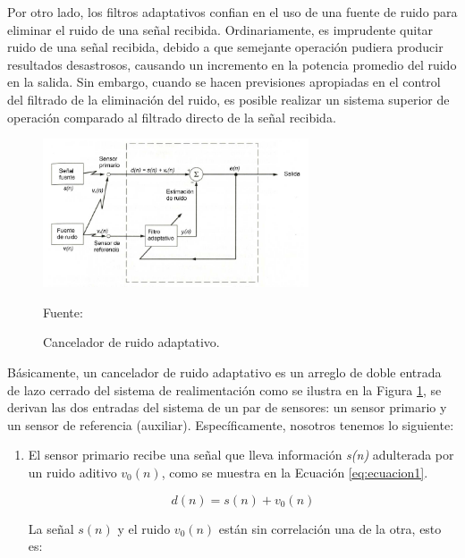 \begin{enumerate}
\begin{enumerate}
Por otro lado, los filtros adaptativos confian en el uso de una fuente de ruido para eliminar el ruido de una señal recibida. Ordinariamente, es imprudente quitar ruido de una señal recibida, debido a que semejante operación pudiera producir resultados desastrosos, causando un incremento en la potencia promedio del ruido en la salida. Sin embargo, cuando se hacen previsiones apropiadas en el control del filtrado de la eliminación del ruido, es posible realizar un sistema superior de operación comparado al filtrado directo de la señal recibida.

\vskip 0.5cm
\begin{figure}[ht]
\begin{center}
\includegraphics[width=0.7\textwidth]{Imagenes/Cap2/image015}
\end{center}
\begin{center}
\vskip -0.5cm
\caption{\small{Cancelador de ruido adaptativo.}}
\label{fig:figura2.15}
{\small{Fuente: \cite{walter}}}
\end{center}
\end{figure}

Básicamente, un cancelador de ruido adaptativo es un arreglo de doble entrada de lazo cerrado del sistema de realimentación como se ilustra en la Figura \ref{fig:figura2.15}, se derivan las dos entradas del sistema de un par de sensores: un sensor primario y un sensor de referencia (auxiliar). Específicamente, nosotros tenemos lo siguiente:

\begin{enumerate}
\item[1.]El sensor primario recibe una señal que lleva información \textit{s(n)} adulterada por un ruido aditivo \textit{$v_{0}(n)$}, como se muestra en la Ecuación \eqref{eq:ecuacion1}.

\begin{equation}
\label{eq:ecuacion1}
d(n) = s(n) + v_{0}(n)
\end{equation}

La señal $s(n)$ y el ruido $v_{0}(n)$ están sin correlación una de la otra, esto es:


\end{enumerate}
\end{enumerate}
\end{enumerate}

